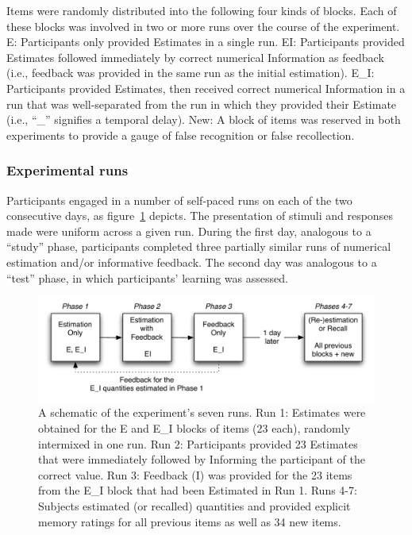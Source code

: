 Items were randomly distributed into the following four kinds of blocks. Each of
these blocks was involved in two or more runs over the course of the experiment.
E: Participants only provided Estimates in a single run. EI: Participants
provided Estimates followed immediately by correct numerical Information as
feedback (i.e., feedback was provided in the same run as the initial
estimation). E\_I: Participants provided Estimates, then received correct
numerical Information in a run that was well-separated from the run in which
they provided their Estimate (i.e., ``\_'' signifies a temporal delay). New: A
block of items was reserved in both experiments to provide a gauge of false
recognition or false recollection.

\subsubsection{Experimental runs}

Participants engaged in a number of self-paced runs on each of the two
consecutive days, as figure~\ref{ei-procedure} depicts. The presentation of
stimuli and responses made were uniform across a given run. During the first
day, analogous to a ``study'' phase, participants completed three partially
similar runs of numerical estimation and/or informative feedback. The second day
was analogous to a ``test'' phase, in which participants’ learning was assessed.

 
\begin{figure}[h]
\includegraphics[width=\textwidth]{Experiment1-procedure.pdf}
\caption{A schematic of the experiment's seven runs. Run 1:
Estimates were obtained for the E and E\_I blocks of items (23 each), randomly
intermixed in one run. Run 2: Participants provided 23 Estimates that were
immediately followed by Informing the participant of the correct value. Run 3:
Feedback (I) was provided for the 23 items from the E\_I block that had been
Estimated in Run 1. Runs 4-7: Subjects estimated (or recalled) quantities and
provided explicit memory ratings for all previous items as well as 34 new
items.}
\label{ei-procedure} 
\end{figure}

